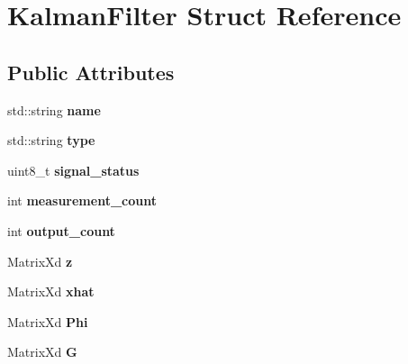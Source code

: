 \hypertarget{structKalmanFilter}{}\section{Kalman\+Filter Struct Reference}
\label{structKalmanFilter}
\subsection*{Public Attributes}
\begin{DoxyCompactItemize}
\item 
\mbox{\label{structKalmanFilter_af2235858db35197f89e800f9ba7caa83}} 
std\+::string {\bfseries name}
\item 
\mbox{\label{structKalmanFilter_a56ddecb49bc1047371f94e51eb5826bd}} 
std\+::string {\bfseries type}
\item 
\mbox{\label{structKalmanFilter_af03956d367e20a6b2602d809f7f8c47c}} 
uint8\+\_\+t {\bfseries signal\+\_\+status}
\item 
\mbox{\label{structKalmanFilter_a912c13c63bf9396f8b97d7395d398b2a}} 
int {\bfseries measurement\+\_\+count}
\item 
\mbox{\label{structKalmanFilter_ad1f22e4a02ffdbe163cd046291470f07}} 
int {\bfseries output\+\_\+count}
\item 
\mbox{\label{structKalmanFilter_ab087a1c7bfa1f48c24c5754be14b7c3c}} 
Matrix\+Xd {\bfseries z}
\item 
\mbox{\label{structKalmanFilter_a5032b67dc5f46e28d908728acb4918d2}} 
Matrix\+Xd {\bfseries xhat}
\item 
\mbox{\label{structKalmanFilter_a035cb857ec1013165c08e9f5205b9397}} 
Matrix\+Xd {\bfseries Phi}
\item 
\mbox{\label{structKalmanFilter_acde219083a26a3e386bb5c689f27e18a}} 
Matrix\+Xd {\bfseries G}
\item 
\mbox{\label{structKalmanFilter_a0b110863cc102e13ece7faed49a96b8d}} 

\end{DoxyCompactItemize}
